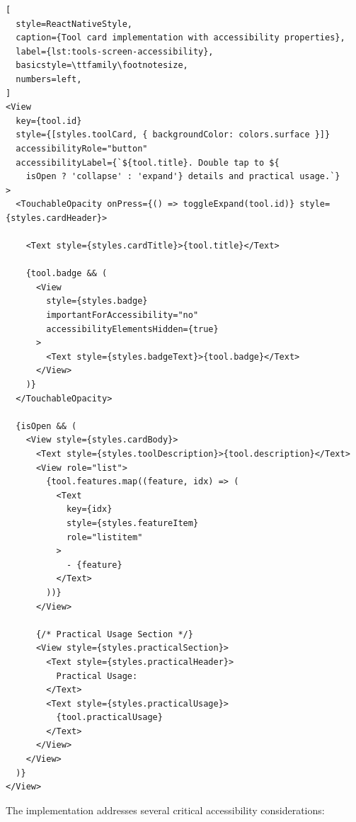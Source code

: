 \begin{lstlisting}[
  style=ReactNativeStyle,
  caption={Tool card implementation with accessibility properties},
  label={lst:tools-screen-accessibility},
  basicstyle=\ttfamily\footnotesize,
  numbers=left,
]
<View
  key={tool.id}
  style={[styles.toolCard, { backgroundColor: colors.surface }]}
  accessibilityRole="button"
  accessibilityLabel={`${tool.title}. Double tap to ${
    isOpen ? 'collapse' : 'expand'} details and practical usage.`}
>
  <TouchableOpacity onPress={() => toggleExpand(tool.id)} style={styles.cardHeader}>
    
    <Text style={styles.cardTitle}>{tool.title}</Text>
    
    {tool.badge && (
      <View 
        style={styles.badge} 
        importantForAccessibility="no" 
        accessibilityElementsHidden={true}
      >
        <Text style={styles.badgeText}>{tool.badge}</Text>
      </View>
    )}
  </TouchableOpacity>

  {isOpen && (
    <View style={styles.cardBody}>
      <Text style={styles.toolDescription}>{tool.description}</Text>
      <View role="list">
        {tool.features.map((feature, idx) => (
          <Text 
            key={idx} 
            style={styles.featureItem} 
            role="listitem"
          >
            - {feature}
          </Text>
        ))}
      </View>
      
      {/* Practical Usage Section */}
      <View style={styles.practicalSection}>
        <Text style={styles.practicalHeader}>
          Practical Usage:
        </Text>
        <Text style={styles.practicalUsage}>
          {tool.practicalUsage}
        </Text>
      </View>
    </View>
  )}
</View>
\end{lstlisting}
\FloatBarrier

The implementation addresses several critical accessibility considerations:

